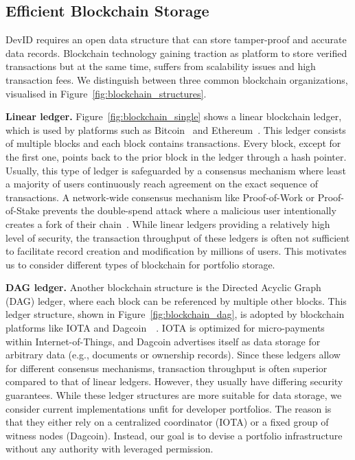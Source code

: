 \subsection{Efficient Blockchain Storage}
\label{subsec:scalable_blockchain}
DevID requires an open data structure that can store tamper-proof and accurate data records.
Blockchain technology gaining traction as platform to store verified transactions but at the same time, suffers from scalability issues and high transaction fees.
We distinguish between three common blockchain organizations, visualised in Figure~\ref{fig:blockchain_structures}.

\textbf{Linear ledger.} Figure~\ref{fig:blockchain_single} shows a linear blockchain ledger, which is used by platforms such as Bitcoin~\cite{nakamoto2008bitcoin} and Ethereum~\cite{wood2014ethereum}.
This ledger consists of multiple blocks and each block contains transactions.
Every block, except for the first one, points back to the prior block in the ledger through a hash pointer.
Usually, this type of ledger is safeguarded by a consensus mechanism where least a majority of users continuously reach agreement on the exact sequence of transactions.
A network-wide consensus mechanism like Proof-of-Work or Proof-of-Stake prevents the double-spend attack where a malicious user intentionally creates a fork of their chain~\cite{vukolic2015quest}.
While linear ledgers providing a relatively high level of security, the transaction throughput of these ledgers is often not sufficient to facilitate record creation and modification by millions of users.
This motivates us to consider different types of blockchain for portfolio storage.

\textbf{DAG ledger.} Another blockchain structure is the Directed Acyclic Graph (DAG) ledger, where each block can be referenced by multiple other blocks.
This ledger structure, shown in Figure~\ref{fig:blockchain_dag}, is adopted by blockchain platforms like IOTA and Dagcoin~\cite{popov2018tangle}~\cite{lerner2015dagcoin}.
IOTA is optimized for micro-payments within Internet-of-Things, and Dagcoin advertises itself as data storage for arbitrary data (e.g., documents or ownership records).
Since these ledgers allow for different consensus mechanisms, transaction throughput is often superior compared to that of linear ledgers.
However, they usually have differing security guarantees.
While these ledger structures are more suitable for data storage, we consider current implementations unfit for developer portfolios.
The reason is that they either rely on a centralized coordinator (IOTA) or a fixed group of witness nodes (Dagcoin).
Instead, our goal is to devise a portfolio infrastructure without any authority with leveraged permission.

